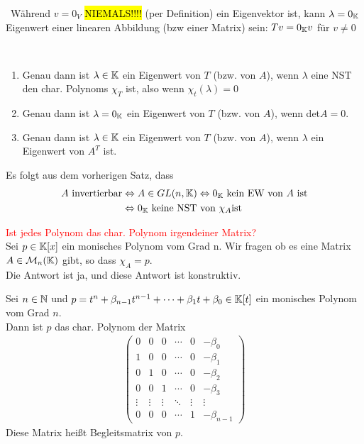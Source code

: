 \begin{remark}\,
Während $v=0_V$ \textcolor{red}{\hl{NIEMALS!!!!}} (per Definition) ein Eigenvektor ist, kann $\lambda=0_{\mathbb{K}}$ Eigenwert einer linearen Abbildung (bzw einer Matrix) sein: $Tv=0_{\mathbb{K}} v$ für $v\neq0$
\end{remark}

\begin{theorem}\,
\begin{enumerate}
    \item Genau dann ist  $\lambda\in\mathbb{K}$ ein Eigenwert von $T$ (bzw. von $A$), wenn $\lambda $ eine NST den char. Polynoms $\chi_T$ ist, also wenn $\chi_t(\lambda)=0$
    \item Genau dann ist $\lambda=0_{\mathbb{K}}$ ein Eigenwert von $T$ (bzw. von $A$), wenn det$A=0$.
    \item Genau dann ist $\lambda\in\mathbb{K}$ ein Eigenwert von $T$ (bzw. von $A$), wenn $\lambda$ ein Eigenwert von $A^T$ ist.
\end{enumerate}
\end{theorem}

\begin{remark}
Es folgt aus dem vorherigen Satz, dass
\begin{align*} 
   A \text{ invertierbar} &\Leftrightarrow A\in GL(n,\mathbb{K}) \Leftrightarrow 0_{\mathbb{K}} \text{ kein EW von } A \text{ ist}\\
   &\Leftrightarrow 0_{\mathbb{K}} \text{ keine NST von } \chi_A \text{ist}
\end{align*}
\end{remark}

\textcolor{red}{Ist jedes Polynom das char. Polynom irgendeiner Matrix?}\\
Sei $p\in\mathbb{K}[x]$ ein monisches Polynom vom Grad n. Wir fragen ob es eine Matrix $A\in\mathcal{M}_n(\mathbb{K})$ gibt, so dass $\chi_A=p$.\\
Die Antwort ist ja, und diese Antwort ist konstruktiv.

\begin{theorem}
Sei $n\in\mathbb{N}$ und $p=t^n+\beta_{n-1}t^{n-1}+\dotsb+\beta_1t+\beta_0\in\mathbb{K}[t]$ ein monisches Polynom vom Grad $n$.\\
Dann ist $p$ das char. Polynom der Matrix
\begin{align*}
   \left( \begin{matrix} 0 & 0 & 0 & \dotsb & 0 & -\beta_0 \\ 1 & 0 & 0 & \dotsb & 0 & -\beta_1 \\ 0 & 1 & 0 & \dotsb & 0 & -\beta_2 \\ 0 & 0 & 1 & \dotsb & 0 & -\beta_3 \\ \vdots & \vdots & \vdots & \ddots & \vdots & \vdots \\ 0 & 0 & 0 & \dotsb & 1 & -\beta_{n-1} \end{matrix} \right) 
\end{align*}
Diese Matrix heißt Begleitsmatrix von $p$.
\end{theorem}

